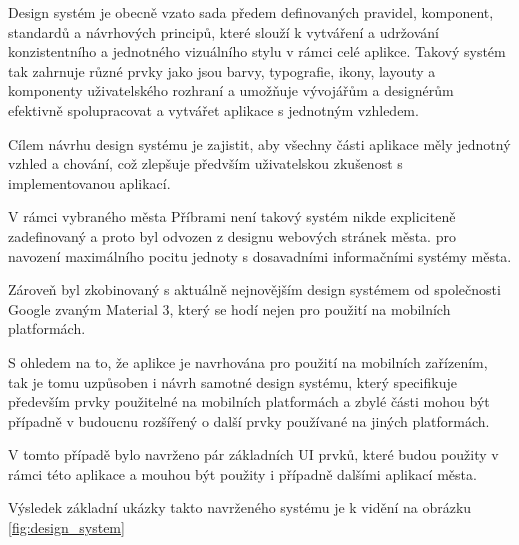 
Design systém je obecně vzato sada předem definovaných pravidel, komponent, standardů a návrhových principů, které slouží k vytváření a udržování 
konzistentního a jednotného vizuálního stylu v rámci celé aplikce. Takový systém tak zahrnuje různé prvky jako jsou barvy, typografie, ikony,
layouty a komponenty uživatelského rozhraní a umožňuje vývojářům a designérům efektivně spolupracovat a vytvářet aplikace s jednotným 
vzhledem. 
 
Cílem návrhu design systému je zajistit, aby všechny části aplikace měly jednotný vzhled a chování, což zlepšuje předvším uživatelskou 
zkušenost s implementovanou aplikací. 



V rámci vybraného města Příbrami není takový systém nikde expliciteně zadefinovaný a proto byl odvozen z designu webových stránek města.
pro navození maximálního pocitu jednoty s dosavadními informačními systémy města.

Zároveň byl zkobinovaný s aktuálně nejnovějším design systémem od společnosti Google zvaným Material 3, který se hodí nejen pro použití
na mobilních platformách.

S ohledem na to, že aplikce je navrhována pro použití na mobilních zařízením, tak je tomu uzpůsoben i návrh samotné design systému, který
specifikuje především prvky použitelné na mobilních platformách a zbylé části mohou být případně v budoucnu rozšířený o další prvky 
používané na jiných platformách.

V tomto případě bylo navrženo pár základních UI prvků, které budou použity v rámci této aplikace a mouhou být použity i případně dalšími 
aplikací města.

Výsledek základní ukázky takto navrženého systému je k vidění na obrázku \ref{fig:design_system}


